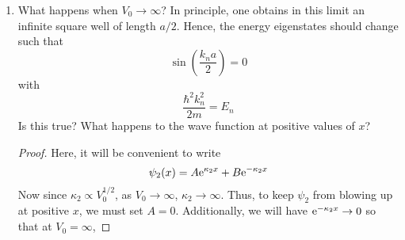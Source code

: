 \documentclass[../psets.tex]{subfiles}
\begin{document}
\begin{enumerate}
\begin{enumerate}
\begin{proof}
\begin{equation*}
                = k_2
            \end{equation*}
            Additionally, define
            \begin{align*}
                S_2 &:= -i\tilde{S}_2&
                C_2 &:= \tilde{C}_2
            \end{align*}
            Thus,
            \begin{equation*}
                \boxed{\psi_2(x) = S_2\sin(k_2x)+C_2\cos(k_2x)}
            \end{equation*}
            Additionally, we still have that
            \begin{equation*}
                \psi_1(x) = S_1\sin(k_1x)+C_1\cos(k_1x)
            \end{equation*}
            so the boundary conditions at $x=0$ imply by transitivity that
            \begin{align*}
                C_1 &= C_2 = \tilde{C}_2&
                k_1S_1 &= k_2S_2 = (i\kappa_2)(-i\tilde{S}_2) = \kappa_2\tilde{S}_2
            \end{align*}
            Since $\psi_2$ will vanish if and only if $\tilde{S}_2=\tilde{C}_2=0$, the above two equations imply that in this case, $S_1=C_1=0$, too. Therefore, in general, it is  still true in quantum mechanics that a particle cannot enter a region where the potential energy is larger than the energy of the particle. In other words, the probability of finding the particle at positive values of $x$  vanish.
        \end{proof}
        \item What happens when $V_0\to\infty$? In principle, one obtains in this limit an infinite square well of length $a/2$. Hence, the energy eigenstates should change such that
        \begin{equation}
            \sin(\frac{k_na}{2}) = 0
        \end{equation}
        with
        \begin{equation}
            \frac{\hbar^2k_n^2}{2m} = E_n
        \end{equation}
        Is this true? What happens to the wave function at positive values of $x$?
        \begin{proof}
            Here, it will be convenient to write
            \begin{equation*}
                \psi_2(x) = A\e[\kappa_2x]+B\e[-\kappa_2x]
            \end{equation*}
            Now since $\kappa_2\propto V_0^{1/2}$, as $V_0\to\infty$, $\kappa_2\to\infty$. Thus, to keep $\psi_2$ from blowing up at positive $x$, we must set $A=0$. Additionally, we will have $\e[-\kappa_2x]\to 0$ so that at $V_0=\infty$,

\end{proof}
\end{enumerate}
\end{enumerate}
\end{document}
